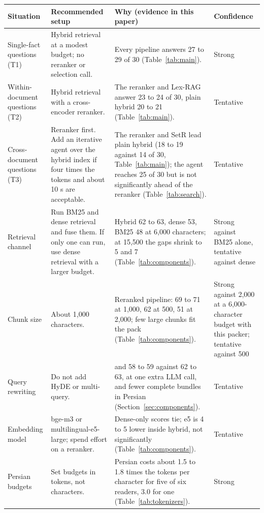 \begin{table}[t]
\centering
\scriptsize
\setlength{\tabcolsep}{3pt}
\renewcommand{\arraystretch}{1.02}
\begin{tabularx}{\textwidth}{@{}>{\raggedright\arraybackslash}p{2.5cm}>{\raggedright\arraybackslash}p{4.9cm}>{\raggedright\arraybackslash}X>{\raggedright\arraybackslash}p{1.9cm}@{}}
\toprule
Situation & Recommended setup & Why (evidence in this paper) & Confidence \\
\midrule
Single-fact questions (T1) & Hybrid retrieval at a modest budget; no reranker or selection call. & Every pipeline answers 27 to 29 of 30 (Table~\ref{tab:main}). & Strong \\
Within-document questions (T2) & Hybrid retrieval with a cross-encoder reranker. & The reranker and Lex-RAG answer 23 to 24 of 30, plain hybrid 20 to 21 (Table~\ref{tab:main}). & Tentative \\
Cross-document questions (T3) & Reranker first. Add an iterative agent over the hybrid index if four times the tokens and about 10 s are acceptable. & The reranker and SetR lead plain hybrid (18 to 19 against 14 of 30, Table~\ref{tab:main}); the agent reaches 25 of 30 but is not significantly ahead of the reranker (Table~\ref{tab:search}). & Tentative \\
Retrieval channel & Run BM25 and dense retrieval and fuse them. If only one can run, use dense retrieval with a larger budget. & Hybrid 62 to 63, dense 53, BM25 48 at 6,000 characters; at 15,500 the gaps shrink to 5 and 7 (Table~\ref{tab:components}). & Strong against BM25 alone, tentative against dense \\
Chunk size & About 1,000 characters. & Reranked pipeline: 69 to 71 at 1,000, 62 at 500, 51 at 2,000; few large chunks fit the pack (Table~\ref{tab:components}). & Strong against 2,000 at a 6,000-character budget with this packer; tentative against 500 \\
Query rewriting & Do not add HyDE or multi-query. & 61 and 58 to 59 against 62 to 63, at one extra LLM call, and fewer complete bundles in Persian (Section~\ref{sec:components}). & Tentative \\
Embedding model & bge-m3 or multilingual-e5-large; spend effort on a reranker. & Dense-only scores tie; e5 is 4 to 5 lower inside hybrid, not significantly (Table~\ref{tab:components}). & Tentative \\
Persian budgets & Set budgets in tokens, not characters. & Persian costs about 1.5 to 1.8 times the tokens per character for five of six readers, 3.0 for one (Table~\ref{tab:tokenizers}). & Strong \\

\end{tabularx}
\end{table}
